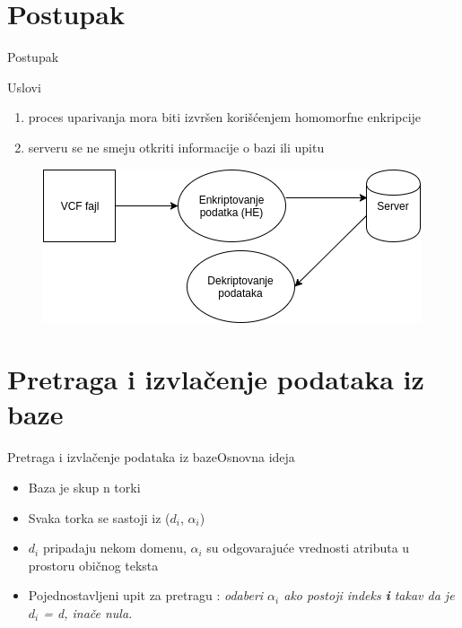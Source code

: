 \documentclass[10pt]{beamer}
\begin{document}
\section{Postupak}
\begin{frame}{Postupak}
\begin{block}{Uslovi}
	\begin{enumerate}
		\item proces uparivanja mora biti izvršen korišćenjem homomorfne enkripcije
		\item serveru se ne smeju otkriti informacije o bazi ili upitu
	\end{enumerate}			
\end{block}
\begin{figure}[H]
 	\centering
	\includegraphics[width=\textwidth,height=\textheight,keepaspectratio]{slika3.png}
 	\label{fig:primer}
 \end{figure}
\end{frame}



\section{Pretraga i izvlačenje podataka iz baze}
\begin{frame}{Pretraga i izvlačenje podataka iz baze}{Osnovna ideja}
\begin{block}{}
\begin{itemize}
\item Baza je skup n torki
\item Svaka torka se sastoji iz ($d_i$, $\alpha_i$)
\item $d_i$ pripadaju nekom domenu, $\alpha_i$ su odgovarajuće vrednosti atributa u prostoru običnog teksta 
\item Pojednostavljeni upit za pretragu : \textit{odaberi $\alpha_i$ ako postoji indeks \textbf{i} takav da je $d_i$ = d, inače nula.}
\end{itemize}
\end{block}

\end{frame}
\end{document}
